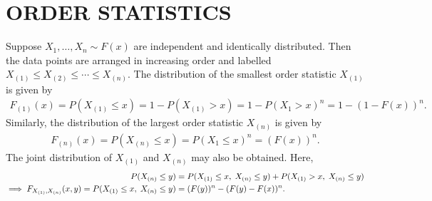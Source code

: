 \chapter{ORDER STATISTICS}

Suppose $X_{1},\ldots,X_{n} \sim F(x)$ are independent and identically distributed. Then the data points are arranged in increasing order and labelled $X_{(1)} \leq X_{(2)} \leq \cdots \leq X_{(n)}$. The distribution of the smallest order statistic $X_{(1)}$ is given by
\begin{align}
    F_{(1)}(x) = P(X_{(1)} \leq x) = 1 - P(X_{(1)} > x) = 1 - P(X_{1} > x)^{n} = 1 - (1 - F(x))^{n}.
\end{align}
Similarly, the distribution of the largest order statistic $X_{(n)}$ is given by
\begin{align}
    F_{(n)}(x) = P(X_{(n)} \leq x) = P(X_{1} \leq x)^{n} = (F(x))^{n}.
\end{align}
The joint distribution of $X_{(1)}$ and $X_{(n)}$ may also be obtained. Here,
\begin{align}
    P(X_{(n)} \leq y) &= P(X_{(1)} \leq x,\;X_{(n)} \leq y) + P(X_{(1)} > x,\;X_{(n)} \leq y) \notag \\
    \implies F_{X_{(1)},X_{(n)}}(x,y) = P(X_{(1)}\leq x,\;X_{(n)} \leq y) &= (F(y))^{n} - (F(y)-F(x))^{n}.
\end{align}